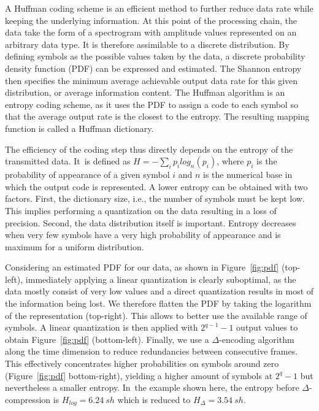 \documentclass[sensors,article,accept,moreauthors,pdftex,10pt,a4paper]{mdpi}
\begin{document}
A Huffman coding scheme \cite{huffman1952} is an efficient method to further reduce data rate while keeping the underlying information. At this point of the processing chain, the data {take} the form of a spectrogram with amplitude values represented on an arbitrary data type. It is therefore assimilable to a discrete distribution. By defining symbols as the possible values taken by the data, a discrete probability density function (PDF) can be expressed and estimated. The Shannon entropy then specifies the minimum average achievable output data rate for this given distribution, or average information content. The Huffman algorithm is an entropy coding scheme, as it uses the PDF to assign a code to each symbol so that the average output rate is the closest to the entropy. The resulting mapping function is called a Huffman dictionary.

The efficiency of the coding step thus directly depends on the entropy of the transmitted data. It~is defined as $H = -\sum\limits_i p_ilog_n(p_i)$, where $p_i$ is the probability of appearance of a given symbol $i$ and $n$ {is} the numerical base in which the output code is represented. A lower entropy can be obtained with two factors. First, the dictionary {size,} i.e., the number of symbols must be kept low. This implies performing a quantization on the data resulting in a loss of precision. Second, the data distribution itself is important. Entropy decreases when very few symbols have a very high probability of appearance and is maximum for a uniform distribution.

Considering an estimated PDF for our {data,} as shown in Figure~\ref{fig:pdf} (top-left), immediately applying a linear quantization is clearly suboptimal, as the data mostly {consist} of very low values and a direct quantization results in most of the information being lost. We therefore flatten the PDF by taking the logarithm of the representation (top-right). This allows to better use the available range of symbols. A linear quantization is then applied with $2^{q-1}-1$ output values to obtain Figure~\ref{fig:pdf} (bottom-left). Finally, we use a $\Delta$-encoding algorithm along the time dimension to reduce redundancies between consecutive frames. This effectively concentrates higher probabilities on symbols around zero (Figure~\ref{fig:pdf} bottom-right), yielding a higher amount of symbols at $2^q-1$ but nevertheless a smaller entropy. In~the example shown here, the entropy before $\Delta$-compression is $H_{log} = 6.24~sh$ which is reduced to $H_{\Delta} = 3.54~sh$.
\vspace{-6pt}
\end{document}
